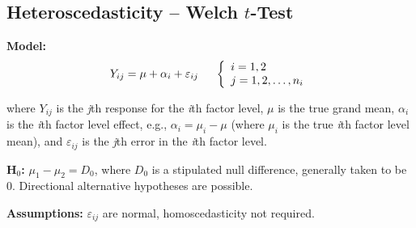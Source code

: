 \documentclass[12pt,english]{article}\usepackage[]{graphicx}\usepackage[table]{xcolor}
\begin{document}
\subsection{Heteroscedasticity -- Welch $t$-Test}
\textbf{Model:} \[Y_{ij} = \mu + \alpha_i + \varepsilon_{ij} \hspace{0.2in} \left\{
                \begin{array}{ll}
                  i = 1,2\\
                  j = 1,2,\dots,n_i\\
                  \end{array}
              \right.\]

\noindent where $Y_{ij}$ is the \textit{j}th response for the \textit{i}th factor level, $\mu$ is the true grand mean, $\alpha_i$ is the \textit{i}th factor level effect, e.g., $\alpha_i = \mu_i - \mu$ (where $\mu_i$ is the true \textit{i}th factor level mean), and $\varepsilon_{ij}$ is the \textit{j}th error in the \textit{i}th factor level. \\
\vspace{0.05in}

\noindent \textbf{H$_0$:} $\mu_1 - \mu_2 = D_0$, where $D_0$ is a stipulated null difference, generally taken to be 0. Directional alternative hypotheses are possible.

\vspace{0.1in}

\noindent \textbf{Assumptions:} $\varepsilon_{ij}$ are normal, homoscedasticity not required.
\vspace{0.1in}
\end{document}
